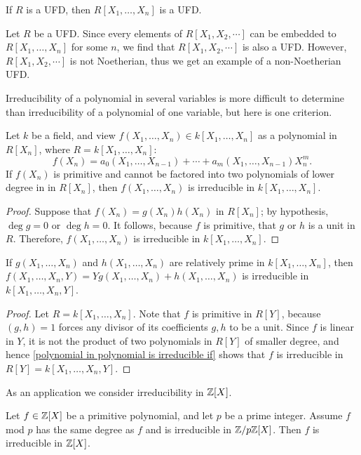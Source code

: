 \begin{corollary}
If $R$ is a UFD, then $R[X_1,\dots,X_n]$ is a UFD.
\end{corollary}
\begin{example}
Let $R$ be a UFD. Since every elements of $R[X_1,X_2,\cdots]$ can be embedded to $R[X_1,\dots,X_n]$ for some $n$, we find that $R[X_1,X_2,\cdots]$ is also a UFD. However, $R[X_1,X_2,\cdots]$ is not Noetherian, thus we get an example of a non-Noetherian UFD.
\end{example}
Irreducibility of a polynomial in several variables is more difficult to determine than irreducibility of a polynomial of one variable, but here is one criterion.
\begin{proposition}\label{polynomial in polynomial is irreducible if}
Let $k$ be a field, and view $f(X_1,\dots,X_n)\in k[X_1,\dots,X_n]$ as a polynomial in $R[X_n]$, where $R=k[X_1,\dots,X_n]$:
\[f(X_n)=a_0(X_1,\dots,X_{n-1})+\cdots+a_m(X_1,\dots,X_{n-1})X_n^m.\]
If $f(X_n)$ is primitive and cannot be factored into two polynomials of lower degree in in $R[X_n]$, then $f(X_1,\dots,X_n)$ is irreducible in $k[X_1,\dots,X_n]$.
\end{proposition}
\begin{proof}
Suppose that $f(X_n)=g(X_n)h(X_n)$ in $R[X_n]$; by hypothesis, $\deg g=0$ or $\deg h=0$. It follows, because $f$ is primitive, that $g$ or $h$ is a unit in $R$. Therefore, $f(X_1,\dots,X_n)$ is irreducible in $k[X_1,\dots,X_n]$.
\end{proof}
\begin{corollary}
If $g(X_1,\dots,X_n)$ and $h(X_1,\dots,X_n)$ are relatively prime in $k[X_1,\dots,X_n]$, then $f(X_1,\dots,X_n,Y)=Yg(X_1,\dots,X_n)+h(X_1,\dots,X_n)$ is irreducible in $k[X_1,\dots,X_n,Y]$.
\end{corollary}
\begin{proof}
Let $R=k[X_1,\dots,X_n]$. Note that $f$ is primitive in $R[Y]$, because $(g,h)=1$ forces any divisor of its coefficients $g,h$ to be a unit. Since $f$ is linear in $Y$, it is not the product of two polynomials in $R[Y]$ of smaller degree, and hence \cref{polynomial in polynomial is irreducible if} shows that $f$ is irreducible in $R[Y]=k[X_1,\dots,X_n,Y]$.
\end{proof}
As an application we consider irreducibility in $\mathbb{Z}[X]$.
\begin{proposition}\label{polynomial in Z irreducible if modulo by p}
Let $f\in\mathbb{Z}[X]$ be a primitive polynomial, and let $p$ be a prime integer. Assume $f$ mod $p$ has the same degree as $f$ and is irreducible in $\mathbb{Z}/p\mathbb{Z}[X]$. Then $f$ is irreducible in $\mathbb{Z}[X]$.
\end{proposition}
